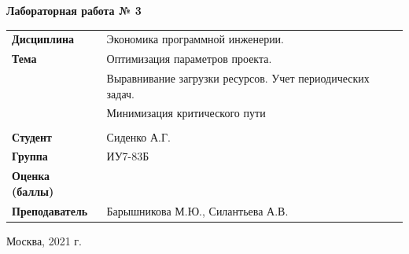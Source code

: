 \documentclass[a4paper,14pt]{extreport} %
\begin{document}
\begin{titlepage}
    \vspace{2cm}

    \begin{center}
        \textbf{Лабораторная работа № 3} \\
        \vspace{0.5cm}
    \end{center}

    \vspace{4cm}

    \begin{flushleft}
        \begin{tabular}{ll}
            \textbf{Дисциплина} & Экономика программной инженерии.  \\
            \textbf{Тема} & Оптимизация параметров проекта. \\
            & Выравнивание загрузки ресурсов. Учет периодических задач. \\
            & Минимизация критического пути \\
            \\
            \textbf{Студент} & Сиденко А.Г. \\
            \textbf{Группа} & ИУ7-83Б \\
            \textbf{Оценка (баллы)} & \\
            \textbf{Преподаватель} & Барышникова М.Ю., Силантьева А.В.   \\
        \end{tabular}
    \end{flushleft}

    \vspace{4cm}

   \begin{center}
        Москва, 2021 г.
    \end{center}

\end{titlepage}
\end{document}
